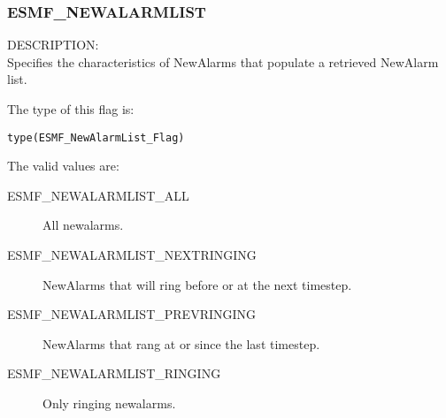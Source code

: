 
\subsubsection{ESMF\_NEWALARMLIST}
\label{const:newalarmlist}

{\sf DESCRIPTION:\\}
Specifies the characteristics of NewAlarms that populate
a retrieved NewAlarm list.

The type of this flag is:

{\tt type(ESMF\_NewAlarmList\_Flag)}

The valid values are:
\begin{description}

\item [ESMF\_NEWALARMLIST\_ALL] 
      All newalarms.

\item [ESMF\_NEWALARMLIST\_NEXTRINGING] 
      NewAlarms that will ring before or at the next timestep.

\item [ESMF\_NEWALARMLIST\_PREVRINGING] 
      NewAlarms that rang at or since the last timestep.

\item [ESMF\_NEWALARMLIST\_RINGING] 
      Only ringing newalarms.

\end{description}

